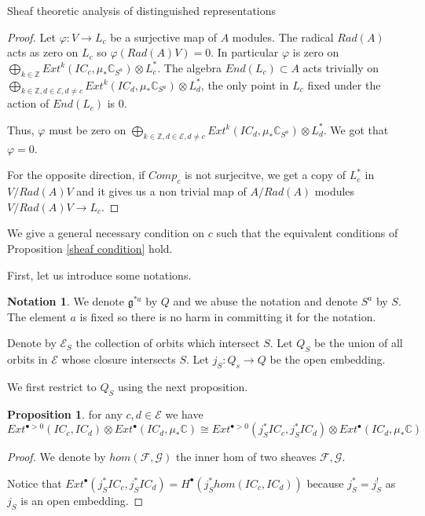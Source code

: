 \documentclass[12pt]{article}
\newcommand{\C}{\mathbb{C}}
\newcommand{\Z}{\mathbb{Z}}
\newcommand{\<}{\langle}
\renewcommand{\>}{\rangle}
\theoremstyle{plain}
\theoremstyle{definition}
\newtheorem{prop}[theorem]{Proposition}
\newtheorem{Not}[theorem]{Notation}
\begin{document}
\begin{section}{Sheaf theoretic analysis of distinguished representations}
\begin{proof}
    Let $\varphi:V\rightarrow L_c$ be a surjective map of $A$ modules. The radical $Rad(A)$ acts as zero on $L_c$ so $\varphi(Rad(A)V)=0$. In particular $\varphi$ is zero on $\bigoplus_{k\in \Z}Ext^k(IC_c,\mu_*\C_{S^a})\otimes L_c^*$. The algebra $End(L_c)\subset A$ acts trivially on $\bigoplus_{k\in \Z,d\in \mathcal{E},d\neq c}Ext^k(IC_d,\mu_*\C_{S^a})\otimes L_d^*$, the only point in $L_c$ fixed under the action of $End(L_c)$ is 0. 
    
    Thus, $\varphi$ must be zero on $\bigoplus_{k\in \Z,d\in \mathcal{E},d\neq c}Ext^k(IC_d,\mu_*\C_{S^a})\otimes L_d^*$. We got that $\varphi=0$.

    For the opposite direction, if $Comp_c$ is not surjecitve, we get a copy of $L_c^*$ in $V/Rad(A)V$ and it gives us a non trivial map of $A/Rad(A)$ modules $V/Rad(A)V\rightarrow L_c$.
\end{proof}


We give a general necessary condition on $c$ such that the equivalent conditions of Proposition \ref{sheaf condition} hold.

First, let us introduce some notations.

\begin{Not}
    We denote $\mathfrak{g}^{*a}$ by $Q$ and we abuse the notation and denote $S^a$ by $S$. The element $a$ is fixed so there is no harm in committing it for the notation.

    Denote by $\mathcal{E}_S$ the collection of orbits which intersect $S$. Let $Q_S$ be the union of all orbits in $\mathcal{E}$ whose closure intersects $S$. Let $j_S:Q_s\rightarrow Q$ be the open embedding.
\end{Not}

 We first restrict to $Q_S$ using the next proposition.

    

\begin{prop}
   for any $c,d\in\mathcal{E}$ we have  $$Ext^{\bullet>0}(IC_c,IC_d)\otimes Ext^\bullet(IC_d,\mu_*\C)\cong Ext^{\bullet>0}(j_S^*IC_c,j_S^*IC_d)\otimes Ext^\bullet(IC_d,\mu_*\C)$$
\end{prop}

\begin{proof}
    We denote by $hom(\mathcal{F},\mathcal{G})$ the inner hom of two sheaves $\mathcal{F},\mathcal{G}$.

    Notice that $Ext^{\bullet}(j_S^*IC_c,j_S^*IC_d)=H^{\bullet}(j_S^*hom(IC_c,IC_d))$ because $j_S^*=j_S^!$ as $j_S$ is an open embedding.


\end{proof}
\end{section}
\end{document}
